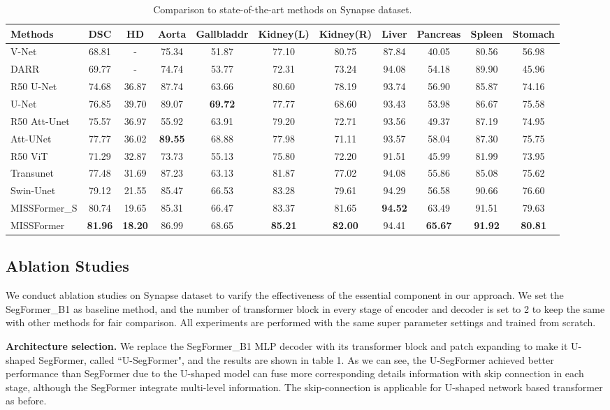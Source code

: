 \documentclass[letterpaper]{article} \usepackage{aaai22}  \usepackage{times}  \usepackage{helvet}  \usepackage{courier}  \usepackage[hyphens]{url}  \usepackage{graphicx} \urlstyle{rm} \def\UrlFont{\rm}  \usepackage{natbib}  \usepackage{caption} \DeclareCaptionStyle{ruled}{labelfont=normalfont,labelsep=colon,strut=off} \frenchspacing  \setlength{\pdfpagewidth}{8.5in}  \setlength{\pdfpageheight}{11in}  \usepackage{algorithm}
\begin{document}
\begin{table*}[t]
	\centering
	\begin{tabular}{l|c|c|c|c|c|c|c|c|c|c}
		\hline
		Methods & DSC & HD  & Aorta & Gallbladdr&Kidney(L)&Kidney(R)&Liver&Pancreas&Spleen&Stomach \\
		\hline
		\hline
V-Net&68.81&-&75.34&51.87&77.10&80.75&87.84&40.05&80.56&56.98\\
		DARR &69.77&-&74.74&53.77&72.31&73.24&94.08&54.18&89.90&45.96\\
		R50 U-Net&74.68&36.87&87.74&63.66&80.60&78.19&93.74&56.90&85.87&74.16\\
		U-Net&76.85&39.70&89.07&\textbf{69.72}&77.77&68.60&93.43&53.98&86.67&75.58\\
		R50 Att-Unet&75.57&36.97&55.92&63.91&79.20&72.71&93.56&49.37&87.19&74.95\\
		Att-UNet&77.77&36.02&\textbf{89.55}&68.88&77.98&71.11&93.57&58.04&87.30&75.75\\
		R50 ViT&71.29&32.87&73.73&55.13&75.80&72.20&91.51&45.99&81.99&73.95\\
		Transunet&77.48&31.69&87.23&63.13&81.87&77.02&94.08&55.86&85.08&75.62\\
		Swin-Unet&79.12&21.55&85.47&66.53&83.28&79.61&94.29&56.58&90.66&76.60\\
		\hline
		MISSFormer\_S&80.74&19.65&85.31&66.47&83.37&81.65&\textbf{94.52}&63.49&91.51&79.63\\
		MISSFormer&\textbf{81.96}&\textbf{18.20}&86.99&68.65&\textbf{85.21}&\textbf{82.00}&94.41&\textbf{65.67}&\textbf{91.92}&\textbf{80.81}\\
		\hline
	\end{tabular}
	\caption{Comparison to state-of-the-art methods on Synapse dataset.}
	\label{table6}
\end{table*}

\subsection{Ablation Studies}
We conduct ablation studies on Synapse dataset to varify the effectiveness of the essential component in our approach. We set the SegFormer\_B1 as baseline method, and the number of transformer block in every stage of encoder and decoder is set to 2 to keep the same with other methods for fair comparison. All experiments are performed with the same super parameter settings and trained from scratch. 

\textbf{Architecture selection.} We replace the SegFormer\_B1 MLP decoder with its transformer block and patch expanding to make it U-shaped SegFormer, called ``U-SegFormer", and the results are shown in table 1. As we can see, the U-SegFormer achieved better performance than SegFormer due to the U-shaped model can fuse more corresponding details information with skip connection in each stage, although the SegFormer integrate multi-level information. The skip-connection is applicable for U-shaped network based transformer as before.
\end{document}
